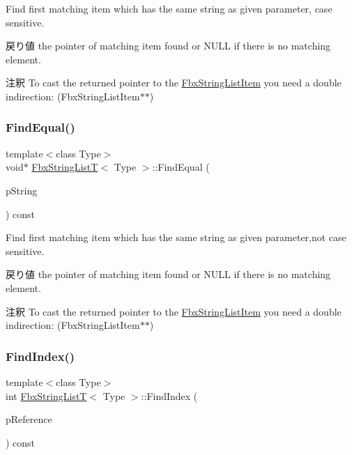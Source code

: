 Find first matching item which has the same string as given parameter, case sensitive. \begin{DoxyReturn}{戻り値}
the pointer of matching item found or N\+U\+LL if there is no matching element. 
\end{DoxyReturn}
\begin{DoxyRemark}{注釈}
To cast the returned pointer to the \hyperlink{class_fbx_string_list_item}{Fbx\+String\+List\+Item} you need a double indirection\+: (Fbx\+String\+List\+Item$\ast$$\ast$) 
\end{DoxyRemark}
\mbox{\label{class_fbx_string_list_t_a476ea46cf72847c070af0868b187cef0}} 
\subsubsection{\texorpdfstring{Find\+Equal()}{FindEqual()}}
{\footnotesize\ttfamily template$<$class Type$>$ \\
void$\ast$ \hyperlink{class_fbx_string_list_t}{Fbx\+String\+ListT}$<$ Type $>$\+::Find\+Equal (\begin{DoxyParamCaption}\item[{const char $\ast$}]{p\+String }\end{DoxyParamCaption}) const}

Find first matching item which has the same string as given parameter,not case sensitive. \begin{DoxyReturn}{戻り値}
the pointer of matching item found or N\+U\+LL if there is no matching element. 
\end{DoxyReturn}
\begin{DoxyRemark}{注釈}
To cast the returned pointer to the \hyperlink{class_fbx_string_list_item}{Fbx\+String\+List\+Item} you need a double indirection\+: (Fbx\+String\+List\+Item$\ast$$\ast$) 
\end{DoxyRemark}
\mbox{\label{class_fbx_string_list_t_a96be804ab1570fc90a651cf6e40cda1f}} 
\subsubsection{\texorpdfstring{Find\+Index()}{FindIndex()}\hspace{0.1cm}{\footnotesize\ttfamily [1/2]}}
{\footnotesize\ttfamily template$<$class Type$>$ \\
int \hyperlink{class_fbx_string_list_t}{Fbx\+String\+ListT}$<$ Type $>$\+::Find\+Index (\begin{DoxyParamCaption}\item[{Fbx\+Handle}]{p\+Reference }\end{DoxyParamCaption}) const}

